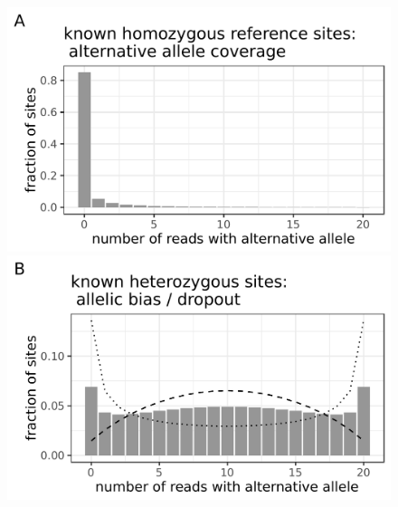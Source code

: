 \documentclass[12pt,inline]{wlscirep}
\begin{document}
\begin{figure}[!tpb]%
  \begin{minipage}[t]{.99\linewidth}
    \begin{minipage}{.47\linewidth}
      \includegraphics[width=.95\linewidth]{figs/Lodato_hom-ref-model_cov-20.pdf}
    \end{minipage}
    \hspace{2ex}
    \begin{minipage}{.47\linewidth}
      \includegraphics[width=.95\linewidth]{figs/Lodato_het-model_cov-20.pdf}
    \end{minipage}
  \end{minipage}
  \vspace{2ex}
  \hspace{1ex}
  \begin{minipage}[t]{.99\linewidth}
    \begin{minipage}{.47\linewidth}

\end{minipage}
\end{minipage}
\end{figure}
\end{document}
